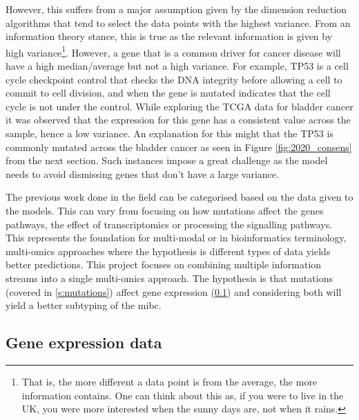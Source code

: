 However, this suffers from a major assumption given by the dimension reduction algorithms that tend to select the data points with the highest variance. From an information theory stance, this is true as the relevant information is given by high variance\footnote{That is, the more different a data point is from the average, the more information contains. One can think about this as, if you were to live in the UK, you were more interested when the sunny days are, not when it rains.}. However, a gene that is a common driver for cancer disease will have a high median/average but not a high variance. For example, TP53 is a cell cycle checkpoint control that checks the DNA integrity before allowing a cell to commit to cell division, and when the gene is mutated indicates that the cell cycle is not under the control. While exploring the TCGA data for bladder cancer \cite{Tcga2018-sj,Robertson2017-mg} it was observed that the expression for this gene has a consistent value across the sample, hence a low variance. An explanation for this might that the TP53 is commonly mutated across the bladder cancer as seen in Figure \ref{fig:2020_consens} from the next section. Such instances impose a great challenge as the model needs to avoid dismissing genes that don't have a large variance.


The previous work done in the field can be categorised based on the data given to the models. This can vary from focusing on how mutations affect the genes pathways, the effect of transcriptomics or processing the signalling pathways. This represents the foundation for multi-modal or in bioinformatics terminology, multi-omics approaches where the hypothesis is different types of data yields better predictions. This project focuses on combining multiple information streams into a single multi-omics approach. The hypothesis is that mutations (covered in \ref{s:mutations}) affect gene expression (\ref{s:rnaSeq}) and considering both will yield a better subtyping of the \acrlong{mibc}.

\subsection{Gene expression data} \label{s:rnaSeq}

